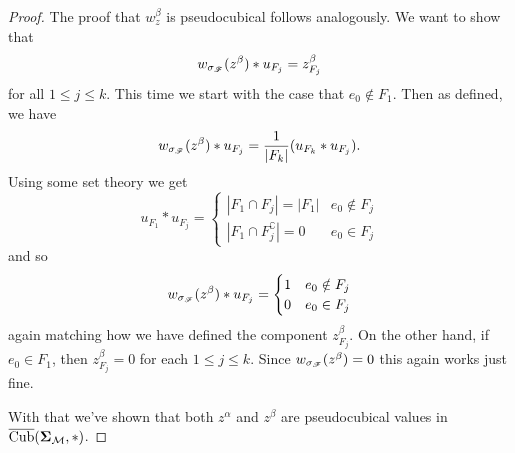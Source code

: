 \documentclass[12pt,oneside]{../../sfsuthesis}
\begin{document}
\begin{proof}
    The proof that \(  w_z^\beta \) is pseudocubical follows analogously.
    We want to show that
    \begin{align*}
        w_{\sigma_{\mathscr{F}}}(z^\beta) \ast u_{F_j} = z^\beta_{F_j}
    \end{align*}
    for all \( 1 \leq j \leq k \).
    This time we start with the case that \( e_0 \notin F_1 \).
    Then as defined, we have
    \[
        w_{\sigma_{\mathscr{F}}}(z^\beta) \ast u_{F_j} = {\frac{1}{|F_k|}}(u_{F_k} \ast u_{F_j}).
    \]
    Using some set theory we get
    \[
        u_{F_1} \ast u_{F_j} =
        \begin{cases}
            |F_1 \cap F_j| = |F_1|         & e_0 \notin F_j \\
            |F_1 \cap F_j^\complement| = 0 & e_0 \in F_j
        \end{cases}
    \]
    and so
    \[
        w_{\sigma_{\mathscr{F}}}(z^\beta) \ast u_{F_j} = \begin{cases}
            1 & e_0 \notin F_j \\
            0 & e_0 \in F_j
        \end{cases}
    \]
    again matching how we have defined the component \( z^\beta_{F_j} \).
    On the other hand, if \( e_0 \in F_1 \), then \( z^\beta_{F_j} = 0 \) for each \( 1 \leq j \leq k \).
    Since \( w_{\sigma_{\mathscr{F}}}(z^\beta) = 0 \) this again works just fine.

    With that we've shown that both \( z^\alpha \) and \( z^\beta \) are pseudocubical values in \( \operatorname{\overline{Cub}}({\bm{\Sigma}}_{\mathcal{M}}, \ast) \).
\end{proof}
\end{document}
